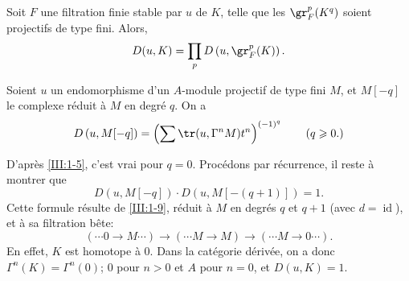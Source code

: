 \begin{lemma_}\label{III:1-10}
Soit $F$ une filtration finie stable par $u$ de $K$, telle que les 
$\gr_F^p(K^q)$ soient projectifs de type fini. Alors, 
\[
  D(u,K) = \prod_p D\left(u,\gr_F^p(K)\right) \text{.}
\]
\end{lemma_}





\begin{lemma_}\label{III:1-11}
Soient $u$ un endomorphisme d'un $A$-module projectif de type fini $M$, et 
$M[-q]$ le complexe réduit à $M$ en degré $q$. On a 
\[
  D\left(u,M[-q]\right) = \left(\sum \tr(u,\Gamma^n M) t^n\right)^{(-1)^q} \qquad \text{($q\geqslant 0$.)}
\]
\end{lemma_}





D'après \ref{III:1-5}, c'est vrai pour $q=0$. Procédons par récurrence, il 
reste à montrer que 
\[
  D\left(u,M[-q]\right) \cdot D\left(u,M[-(q+1)]\right) = 1 \text{.}
\]
Cette formule résulte de \ref{III:1-9},  réduit à 
$M$ en degrés $q$ et $q+1$ (avec $d=\operatorname{id}$), et à sa 
filtration bête:
\[
  (\cdots 0 \to M \cdots) \to (\cdots M \to M) \to (\cdots M \to 0 \cdots) \text{.}
\]
En effet, $K$ est homotope à $0$. Dans la catégorie dérivée, on a donc 
$\Gamma^n(K)=\Gamma^n(0)$; $0$ pour $n>0$ et $A$ pour $n=0$, et $D(u,K)=1$. 





\subsection{}\label{III:1-12}

